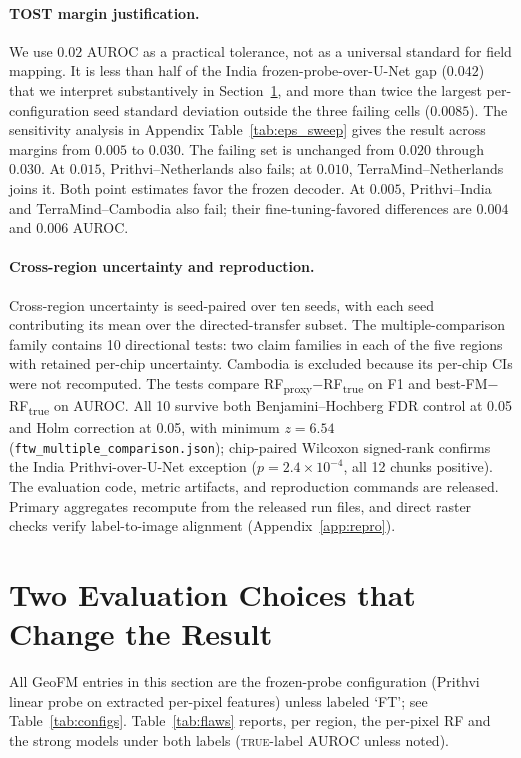 \documentclass{article}
\begin{document}
\paragraph{TOST margin justification.} We use $0.02$ AUROC as a practical tolerance,
not as a universal standard for field mapping. It is less than half of the India
frozen-probe-over-U-Net gap ($0.042$) that we interpret substantively in Section~\ref{sec:flaws},
and more than twice the largest per-configuration seed
standard deviation outside the three failing cells ($0.0085$). The sensitivity analysis
in Appendix Table~\ref{tab:eps_sweep} gives the result across margins from $0.005$ to
$0.030$. The failing set is unchanged from $0.020$ through $0.030$. At $0.015$,
Prithvi--Netherlands also fails; at $0.010$, TerraMind--Netherlands joins it. Both point
estimates favor the frozen decoder. At $0.005$, Prithvi--India and TerraMind--Cambodia also fail;
their fine-tuning-favored differences are $0.004$ and $0.006$ AUROC.

\paragraph{Cross-region uncertainty and reproduction.} Cross-region
uncertainty is seed-paired over ten seeds, with each seed contributing its mean
over the directed-transfer subset. The multiple-comparison family contains 10
directional tests: two claim families in each of the five regions with retained
per-chip uncertainty. Cambodia is excluded because its per-chip CIs were not
recomputed. The tests compare RF\textsubscript{proxy}$-$RF\textsubscript{true}
on F1 and best-FM$-$RF\textsubscript{true} on AUROC. All 10 survive both Benjamini--Hochberg FDR
control at 0.05 and Holm correction at 0.05, with minimum $z{=}6.54$
(\verb|ftw_multiple_comparison.json|); chip-paired Wilcoxon signed-rank confirms
the India Prithvi-over-U-Net exception ($p{=}2.4\times10^{-4}$, all 12 chunks
positive). The evaluation code, metric artifacts, and reproduction commands are
released. Primary aggregates recompute from the released run files, and direct
raster checks verify label-to-image alignment (Appendix~\ref{app:repro}).


\FloatBarrier
\section{Two Evaluation Choices that Change the Result}
\label{sec:flaws}
All GeoFM entries in this section are the frozen-probe configuration (Prithvi linear probe on extracted per-pixel features) unless labeled `FT'; see Table~\ref{tab:configs}.
Table~\ref{tab:flaws} reports, per region, the per-pixel RF and the strong models
under both labels (\textsc{true}-label AUROC unless noted).
\end{document}
